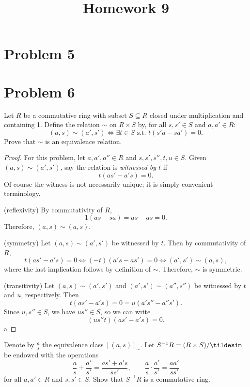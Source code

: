 \documentclass[11pt, letterpaper]{article}
\title{Homework 9}
\begin{document}
\makeproblem
\setcounter{section}{4}
\section{Problem 5}
\section{Problem 6}
\begin{problem}
	Let $R$ be a commutative ring with subset $S\subseteq R$ closed under multiplication and containing 1. Define the relation $\sim $ on $R\times S$ by, for all $s,s'\in S$ and $a,a'\in R$:
	\[
		(a,s)\sim (a',s') \iff \exists t\in S \text{ s.t. } t(s'a-sa')=0
	.\]
	Prove that $\sim $ is an equivalence relation.
\end{problem}
\begin{proof}
	For this problem, let $a,a',a''\in R$ and $s,s',s'',t,u\in S$. Given $(a,s)\sim (a',s')$, say the relation is \emph{witnessed by $t$} if
	\[
		t(as'-a's)=0
	.\]
	Of course the witness is not necessarily unique; it is simply convenient terminology.

	(reflexivity) By commutativity of $R$,
	\[
		1(as-sa)=as-as=0
	.\]
	Therefore, $(a,s)\sim (a,s)$.
	
	(symmetry) Let $(a,s)\sim (a',s')$ be witnessed by $t$. Then by commutativity of $R$,
	\[
		t(as'-a's)=0 \iff (-t)(a's-as')=0 \iff (a',s')\sim (a,s)
	,\]
	where the last implication follows by definition of $\sim $. Therefore, $\sim $ is symmetric.

	(transitivity) Let $(a,s)\sim (a',s')$ and $(a',s')\sim (a'',s'')$ be witnessed by $t$ and $u$, respectively. Then
	\[
		t(as'-a's) = 0 = u(a's''-a''s')
	.\]
	Since $u,s''\in S$, we have $us''\in S$, so we can write
	\[
		(us''t)(as'-a's)=0
	.\]
	a
\end{proof}
\begin{problem}
	Denote by $\frac{a}{s} $ the equivalence class $[(a,s)]_\sim $. Let $S^{-1} R =(R\times S)/\tildesim $ be endowed with the operations
	\[
		\frac{a}{s} +\frac{a'}{s'} =\frac{as'+a's}{ss'} ,\qquad \frac{a}{s} \cdot \frac{a'}{s'} =\frac{aa'}{ss'} 
	\]
	for all $a,a'\in R$ and $s,s'\in S$. Show that $S^{-1} R$ is a commutative ring.
\end{problem}
\end{document}

